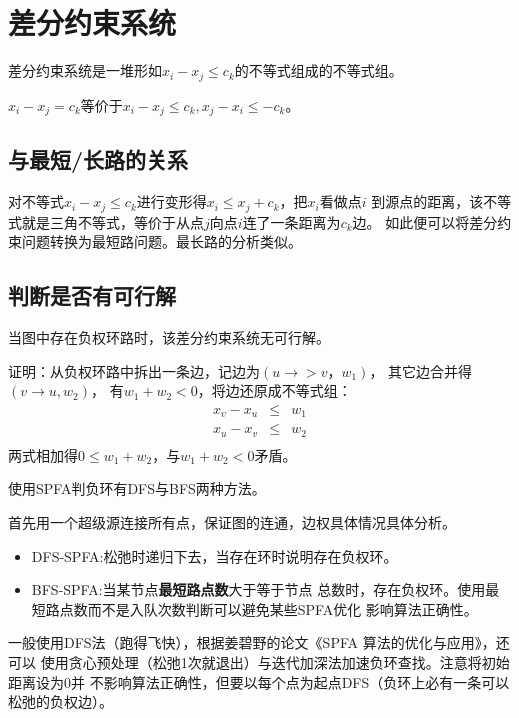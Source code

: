 \section{差分约束系统}
差分约束系统是一堆形如$x_i-x_j\leq c_k$的不等式组成的不等式组。

$x_i-x_j=c_k$等价于$x_i-x_j\leq c_k,x_j-x_i\leq -c_k$。

\subsection{与最短/长路的关系}
对不等式$x_i-x_j\leq c_k$进行变形得$x_i\leq x_j+c_k$，把$x_i$看做点$i$
到源点的距离，该不等式就是三角不等式，等价于从点$j$向点$i$连了一条距离为$c_k$边。
如此便可以将差分约束问题转换为最短路问题。最长路的分析类似。

\subsection{判断是否有可行解}

\begin{theorem}
    当图中存在负权环路时，该差分约束系统无可行解。
\end{theorem}

证明：从负权环路中拆出一条边，记边为$(u\rightarrow >v，w_1)$，
其它边合并得$(v\rightarrow u,w_2)$，
有$w_1+w_2<0$，将边还原成不等式组：
\begin{eqnarray*}
    x_v-x_u&\leq& w_1\\
    x_u-x_v&\leq& w_2\\
\end{eqnarray*}
两式相加得$0\leq w_1+w_2$，与$w_1+w_2<0$矛盾。

使用SPFA判负环有DFS与BFS两种方法。

首先用一个超级源连接所有点，保证图的连通，边权具体情况具体分析。

\begin{itemize}
    \item DFS-SPFA:松弛时递归下去，当存在环时说明存在负权环。
    \item BFS-SPFA:当某节点{\bfseries 最短路点数}大于等于节点
    总数时，存在负权环。使用最短路点数而不是入队次数判断可以避免某些SPFA优化
    影响算法正确性。
\end{itemize}
一般使用DFS法（跑得飞快），根据姜碧野的论文《SPFA 算法的优化与应用》，还可以
使用贪心预处理（松弛1次就退出）与迭代加深法加速负环查找。注意将初始距离设为0并
不影响算法正确性，但要以每个点为起点DFS（负环上必有一条可以松弛的负权边）。

